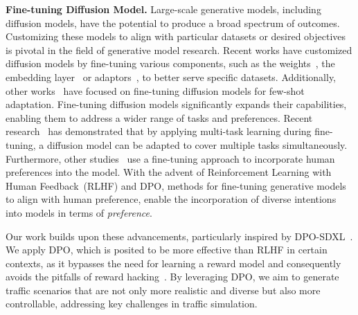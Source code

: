 \noindent
{\bf Fine-tuning Diffusion Model.} Large-scale generative models, including diffusion models, have the potential to produce a broad spectrum of outcomes. Customizing these models to align with particular datasets or desired objectives is pivotal in the field of generative model research. Recent works have customized diffusion models by fine-tuning various components, such as the weights~\cite{fine-tuning1}, the embedding layer~\cite{fine-tuning2} or adaptors~\cite{fine-tuning3}, to better serve specific datasets. Additionally, other works~\cite{fine-tuning4,fine-tuning5} have focused on fine-tuning diffusion models for few-shot adaptation. Fine-tuning diffusion models significantly expands their capabilities, enabling them to address a wider range of tasks and preferences. Recent research~\cite{multitaskdiffusionfinetuning} has demonstrated that by applying multi-task learning during fine-tuning, a diffusion model can be adapted to cover multiple tasks simultaneously. Furthermore, other studies~\cite{diffusionDPO, diffusionrlhf, uehara2024feedback} use a fine-tuning approach to incorporate human preferences into the model. With the advent of Reinforcement Learning with Human Feedback~(RLHF) and DPO, methods for fine-tuning generative models to align with human preference, enable the incorporation of diverse intentions into models in terms of {\it preference}.

Our work builds upon these advancements, particularly inspired by DPO-SDXL~\cite{diffusionDPO}. We apply DPO, which is posited to be more effective than RLHF in certain contexts, as it bypasses the need for learning a reward model and consequently avoids the pitfalls of reward hacking~\cite{dpo}. By leveraging DPO, we aim to generate traffic scenarios that are not only more realistic and diverse but also more controllable, addressing key challenges in traffic simulation.

